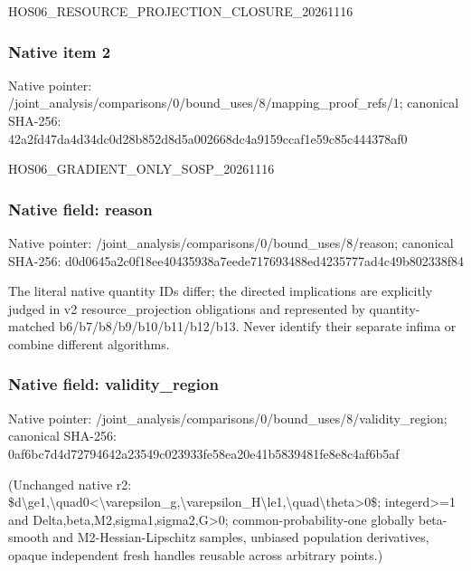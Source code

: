 \documentclass[10pt,a4paper]{article}
\begin{document}
\begingroup\raggedright\sloppy HOS06\_\allowbreak{}RESOURCE\_\allowbreak{}PROJECTION\_\allowbreak{}CLOSURE\_\allowbreak{}20261116\par\endgroup

\subsubsection{Native item 2}
Native pointer: /joint\_\allowbreak{}analysis/comparisons/0/bound\_\allowbreak{}uses/8/mapping\_\allowbreak{}proof\_\allowbreak{}refs/1; canonical SHA-256: 42a2fd47da4d34dc0d28b852d8d5a002668dc4a9159ccaf1e59c85c444378af0

\begingroup\raggedright\sloppy HOS06\_\allowbreak{}GRADIENT\_\allowbreak{}ONLY\_\allowbreak{}SOSP\_\allowbreak{}20261116\par\endgroup

\subsubsection{Native field: reason}
Native pointer: /joint\_\allowbreak{}analysis/comparisons/0/bound\_\allowbreak{}uses/8/reason; canonical SHA-256: d0d0645a2c0f18ee40435938a7eede717693488ed4235777ad4c49b802338f84

\begingroup\raggedright\sloppy The literal native quantity IDs differ;\allowbreak{} the directed implications are explicitly judged in v2 resource\_\allowbreak{}projection obligations and represented by quantity-matched b6/\allowbreak{}b7/\allowbreak{}b8/\allowbreak{}b9/\allowbreak{}b10/\allowbreak{}b11/\allowbreak{}b12/\allowbreak{}b13. Never identify their separate infima or combine different algorithms.\par\endgroup

\subsubsection{Native field: validity\_\allowbreak{}region}
Native pointer: /joint\_\allowbreak{}analysis/comparisons/0/bound\_\allowbreak{}uses/8/validity\_\allowbreak{}region; canonical SHA-256: 0af6bc7d4d72794642a23549c023933fe58ea20e41b5839481fe8e8c4af6b5af

\begingroup\raggedright\sloppy (Unchanged native r2:\allowbreak{} \$d\textbackslash{}ge1,\allowbreak{}\textbackslash{}quad0<\textbackslash{}varepsilon\_\allowbreak{}g,\allowbreak{}\textbackslash{}varepsilon\_\allowbreak{}H\textbackslash{}le1,\allowbreak{}\textbackslash{}quad\textbackslash{}theta>0\$;\allowbreak{} integerd>=\allowbreak{}1 and Delta,\allowbreak{}beta,\allowbreak{}M2,\allowbreak{}sigma1,\allowbreak{}sigma2,\allowbreak{}G>0;\allowbreak{} common-probability-one globally beta-smooth and M2-Hessian-Lipschitz samples,\allowbreak{} unbiased population derivatives,\allowbreak{} opaque independent fresh handles reusable across arbitrary points.)\par\endgroup
\end{document}

